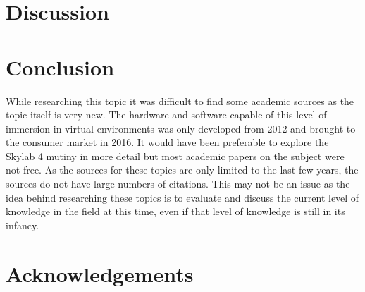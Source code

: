 \documentclass[10pt,journal,compsoc]{IEEEtran}
\begin{document}
\section{Discussion }

	\section{Conclusion}
	While researching this topic it was difficult to find some academic sources as the topic itself is very new. The hardware and software capable of this level of immersion in virtual environments was only developed from 2012 and brought to the consumer market in 2016. It would have been preferable to explore the Skylab 4 mutiny in more detail but most academic papers on the subject were not free. As the sources for these topics are only limited to the last few years, the sources do not have large numbers of citations. This may not be an issue as the idea behind researching these topics is to evaluate and discuss the current level of knowledge in the field at this time, even if that level of knowledge is still in its infancy. 

	\section{Acknowledgements}
\end{document}
